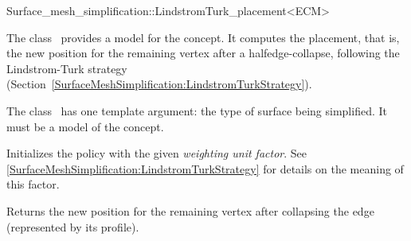 

\begin{ccRefFunctionObjectClass}{Surface_mesh_simplification::LindstromTurk_placement<ECM>}


\ccDefinition

The class \ccRefName\ provides a model for the  concept. 
It computes the placement, that is, the new position for the remaining vertex after
a halfedge-collapse, following the Lindstrom-Turk strategy
(Section~\ref{SurfaceMeshSimplification:LindstromTurkStrategy}).

The class \ccRefName\ has one template argument: the type of surface being simplified. 
It must be a model of the  concept.


\ccIsModel
{}

\ccCreation
{} 
{Initializes the policy with the given {\em weighting unit factor}.
See \ref{SurfaceMeshSimplification:LindstromTurkStrategy} for details on the meaning of this factor.} 

\ccTagFullDeclarations
{} 
  {Returns the new position for the remaining vertex after collapsing the edge
  (represented by its profile).}

\ccSeeAlso
{}
\end{ccRefFunctionObjectClass}


